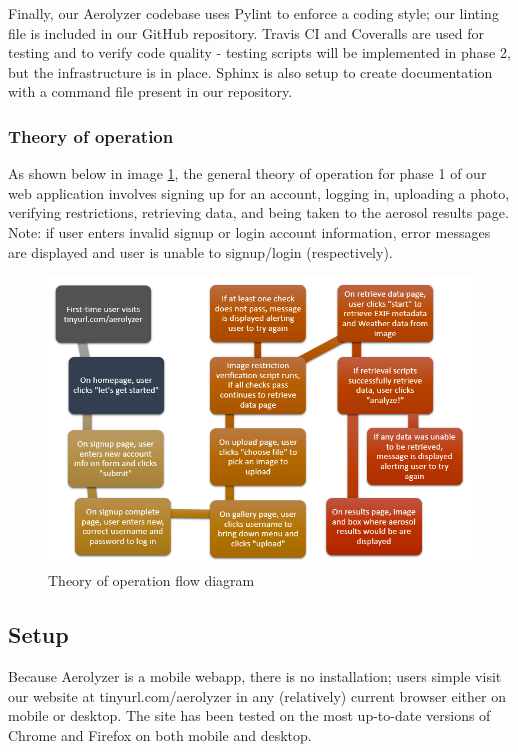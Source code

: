 \documentclass[onecolumn, draftclsnofoot,10pt, compsoc]{IEEEtran}
\begin{document}
\begin{flushleft}
Finally, our Aerolyzer codebase uses Pylint to enforce a coding style; our linting file is included in our GitHub repository. Travis CI and Coveralls are used for testing and to verify code quality - testing scripts will be implemented in phase 2, but the infrastructure is in place. Sphinx is also setup to create documentation with a command file present in our repository.
 
\subsubsection{Theory of operation}
As shown below in image \ref{fig:flow}, the general theory of operation for phase 1 of our web application involves signing up for an account, logging in, uploading a photo, verifying restrictions, retrieving data, and being taken to the aerosol results page. Note: if user enters invalid signup or login account information, error messages are displayed and user is unable to signup/login (respectively).
 
\begin{figure}[H]
\centering
  \includegraphics[width=\textwidth]{flow.PNG}
  \caption{Theory of operation flow diagram}
  \label{fig:flow}
\end{figure}
 
\subsection{Setup}
Because Aerolyzer is a mobile webapp, there is no installation; users simple visit our website at tinyurl.com/aerolyzer in any (relatively) current browser either on mobile or desktop. The site has been tested on the most up-to-date versions of Chrome and Firefox on both mobile and desktop.
 

\end{flushleft}
\end{document}
